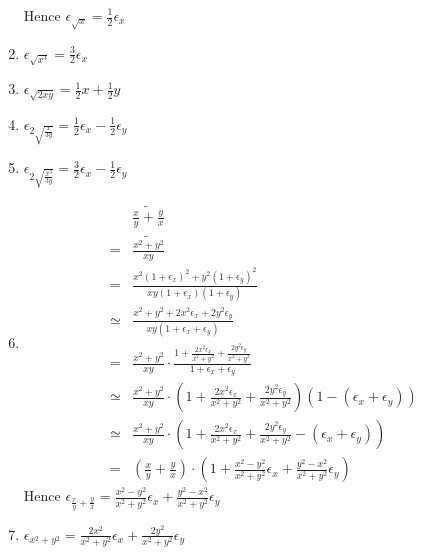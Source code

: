 \documentclass{article}
\begin{document}
\begin{enumerate}[label=(\alph*)]
	      Hence $\epsilon_{\sqrt{x}} = \frac{1}{2} \epsilon_x$
	\item $\epsilon_{\sqrt{x^3}} = \frac{3}{2} \epsilon_x$
	\item $\epsilon_{\sqrt{2xy}} = \frac{1}{2} x + \frac{1}{2} y$
	\item $\epsilon_{2 \sqrt{\frac{x}{3y}}} = \frac{1}{2} \epsilon_x -
		      \frac{1}{2} \epsilon_y$
	\item $\epsilon_{2 \sqrt{\frac{x^3}{3y}}} = \frac{3}{2} \epsilon_x -
		      \frac{1}{2} \epsilon_y$
	\item
	      \begin{align*}
		             & \widetilde{ \frac{x}{y} + \frac{y}{x} }                                                                                                             \\
		      =      & \widetilde{\frac{x^2 + y^2}{xy}}                                                                                                                    \\
		      =      & \frac{x^2 (1+\epsilon_x)^2 + y^2 (1+\epsilon_y)^2} {xy (1+\epsilon_x) (1+\epsilon_y)}                                                               \\
		      \simeq & \frac{x^2 + y^2 + 2x^2\epsilon_x + 2y^2\epsilon_y}{xy (1 + \epsilon_x + \epsilon_y)}                                                                \\
		      =      & \frac{x^2 + y^2}{xy} \cdot \frac{1 + \frac{2x^2\epsilon_x}{x^2 + y^2} + \frac{2y^2\epsilon_y}{x^2 + y^2}} {1 + \epsilon_x + \epsilon_y}             \\
		      \simeq & \frac{x^2 + y^2}{xy} \cdot \left( 1 + \frac{2x^2\epsilon_x}{x^2 + y^2} + \frac{2y^2\epsilon_y}{x^2 + y^2} \right) ( 1 - (\epsilon_x + \epsilon_y) ) \\
		      \simeq & \frac{x^2 + y^2}{xy} \cdot \left( 1 + \frac{2x^2\epsilon_x}{x^2 + y^2} + \frac{2y^2\epsilon_y}{x^2 + y^2} - (\epsilon_x + \epsilon_y) \right)       \\
		      =      & \left( \frac{x}{y} + \frac{y}{x} \right) \cdot \left( 1 + \frac{x^2 - y^2}{x^2 + y^2} \epsilon_x + \frac{y^2 - x^2}{x^2 + y^2} \epsilon_y \right)
	      \end{align*}
	      Hence $\epsilon_{ \frac{x}{y} + \frac{y}{x} } = \frac{x^2 - y^2}{x^2 + y^2} \epsilon_x +
		      \frac{y^2 - x^2}{x^2 + y^2} \epsilon_y $
	\item $\epsilon_{x^2 + y^2} = \frac{2x^2}{x^2 + y^2} \epsilon_x +
		      \frac{2y^2}{x^2 + y^2} \epsilon_y$
\end{enumerate}
\end{document}
